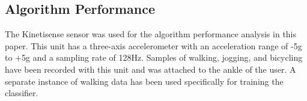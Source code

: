 \documentclass[journal]{IEEEtran}
\begin{document}
\subsection{Algorithm Performance}
%
The Kinetisense sensor was used for the algorithm performance analysis in this paper.
This unit has a three-axis accelerometer with an acceleration range of -5g to +5g and a sampling rate of 128Hz.
Samples of walking, jogging, and bicycling have been recorded with this unit and was attached to the ankle of the user.
A separate instance of walking data has been used specifically for training the classifier.
%
\begin{figure}[!ht]
  \centering
  \quad
  \centering
  \centering
  \quad

\end{figure}
\end{document}
